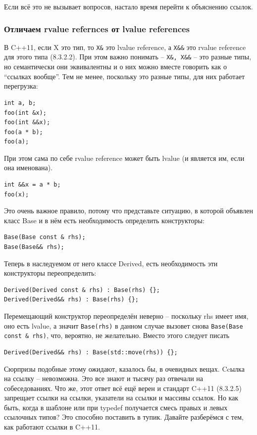 \documentclass[a4paper,12pt,oneside]{article}
\begin{document}
Если всё это не вызывает вопросов, настало время перейти к объяснению ссылок.

\subsubsection{Отличаем rvalue refernces от lvalue references}

В C++11, если X это тип, то \lstinline!X&! это lvalue reference, а \lstinline!X&&! это rvalue reference для этого типа (8.3.2.2). При этом важно понимать -- \lstinline!X&, X&&! -- это разные типы, но семантически они эквивалентны и о них можно вместе говорить как о ``ссылках вообще''. Тем не менее, поскольку это разные типы, для них работает перегрузка:

\begin{lstlisting}
int a, b;
foo(int &x);
foo(int &&x);
foo(a * b);
foo(a);
\end{lstlisting}

При этом сама по себе rvalue reference может быть lvalue (и является им, если она именована).

\begin{lstlisting}
int &&x = a * b;
foo(x);
\end{lstlisting}

Это очень важное правило, потому что представьте ситуацию, в которой объявлен класс Base и в нём есть необходимость определить конструкторы:

\begin{lstlisting}
Base(Base const & rhs);
Base(Base&& rhs);
\end{lstlisting}

Теперь в наследуемом от него классе Derived, есть необходимость эти конструкторы переопределить:

\begin{lstlisting}
Derived(Derived const & rhs) : Base(rhs) {};
Derived(Derived&& rhs) : Base(rhs) {};
\end{lstlisting}

Перемещающий конструктор переопределён неверно -- поскольку rhs имеет имя, оно есть lvalue, а значит \lstinline!Base(rhs)! в данном случае вызовет снова \lstinline!Base(Base const & rhs)!, что, вероятно, не желательно. Вместо этого следует писать

\begin{lstlisting}
Derived(Derived&& rhs) : Base(std::move(rhs)) {};
\end{lstlisting}

Сюрпризы подобные этому ожидают, казалось бы, в очевидных вещах. Ccылка на ссылку -- невозможна. Это все знают и тысячу раз отвечали на собеседованиях. Что же, этот ответ всё ещё верен и стандарт C++11 (8.3.2.5) запрещает ссылки на ссылки, указатели на ссылки и массивы ссылок. Но как быть, когда в шаблоне или при typedef получается смесь правых и левых ссылочных типов? Это способно поставить в тупик. Давайте разберёмся с тем, как работают ссылки в C++11.
\end{document}
